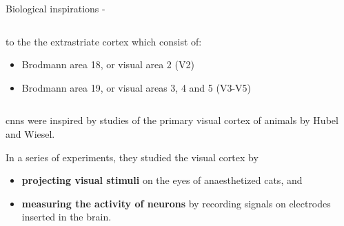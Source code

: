 \begin{frame}[t,allowframebreaks]{Biological inspirations - }
\begin{columns}
\begin{column}{0.62\textwidth}
\begin{itemize}
                 to the the extrastriate cortex which consist of:
                 \begin{itemize}
                    \item Brodmann area 18, or visual area 2 (V2)
                    \item Brodmann area 19, or visual areas 3, 4 and 5 (V3-V5)
                \end{itemize}                    
            \end{itemize}                
        \end{column}
    \end{columns}


    \framebreak

    \glspl{cnn} 
    were inspired by studies of the 
    \gls{primary visual cortex}
    of animals
    by \gls{Hubel} 
    and \gls{Wiesel}\cite{Hubel:1959v1,Hubel:1962v1}.

    In a series of experiments, they studied the visual cortex by 
    \begin{itemize}
    \item {\bf projecting visual stimuli} on the 
      eyes of anaesthetized cats, and
    \item {\bf measuring the activity of neurons} by recording signals 
      on electrodes inserted in the brain.
    \end{itemize}


\end{frame}
